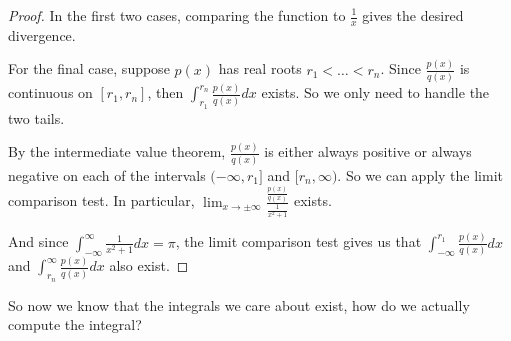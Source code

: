 \begin{proof} In the first two cases, comparing the function to $\frac{1}{x}$ gives the desired divergence.

For the final case, suppose $p(x)$ has real roots $r_1 < \dots < r_n$. Since $\frac{p(x)}{q(x)}$ is continuous on $[r_1,r_n]$, then $\int_{r_1}^{r_n} \frac{p(x)}{q(x)}dx$ exists. So we only need to handle the two tails.

By the intermediate value theorem, $\frac{p(x)}{q(x)}$ is either always positive or always negative on each of the intervals $(-\infty,r_1]$ and $[r_n,\infty)$. So we can apply the limit comparison test. In particular, $\lim_{x\rightarrow \pm \infty} \frac{\frac{p(x)}{q(x)}}{\frac{1}{x^2 + 1}}$ exists.

And since $\int_{-\infty}^\infty \frac{1}{x^2 + 1}dx = \pi$, the limit comparison test gives us that $\int_{-\infty}^{r_1} \frac{p(x)}{q(x)}dx$ and $\int_{r_n}^\infty \frac{p(x)}{q(x)}dx$ also exist.
\end{proof}

So now we know that the integrals we care about exist, how do we actually compute the integral?

